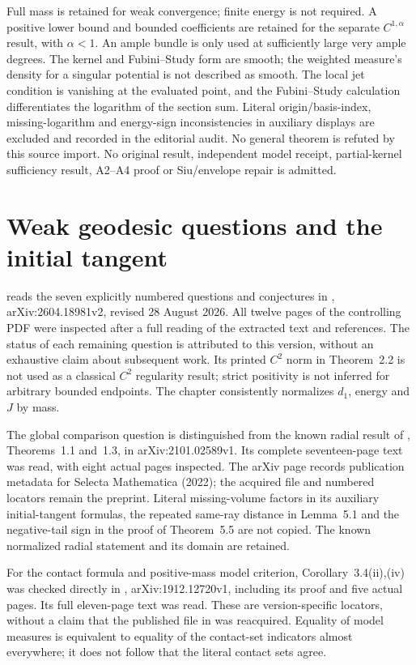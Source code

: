 Full mass is retained for weak convergence; finite energy is not
required. A positive lower bound and bounded coefficients are
retained for the separate $C^{1,\alpha}$ result, with $\alpha<1$.
An ample bundle is only used at sufficiently large very ample degrees.
The kernel and Fubini--Study form are smooth; the weighted measure's
density for a singular potential is not described as smooth.
The local jet condition is vanishing at the evaluated point, and
the Fubini--Study calculation differentiates the logarithm of the
section sum. Literal origin/basis-index, missing-logarithm and
energy-sign inconsistencies in auxiliary displays are excluded and
recorded in the editorial audit. No general theorem is refuted by
this source import. No original result, independent model receipt,
partial-kernel sufficiency result, A2--A4 proof or Siu/envelope repair
is admitted.

\section{Weak geodesic questions and the initial tangent}
\label{sec:provenance-survey-initial-data}

 reads the seven explicitly numbered
questions and conjectures in \cite{Darvas26MetricSurveyV2},
arXiv:2604.18981v2, revised 28 August 2026.
All twelve pages of the controlling PDF were inspected after a
full reading of the extracted text and references. The status of
each remaining question is attributed to this version, without an
exhaustive claim about subsequent work. Its printed $C^2$ norm
in Theorem~2.2 is not used as a classical $C^2$ regularity result;
strict positivity is not inferred for arbitrary bounded endpoints.
The chapter consistently normalizes $d_1$, energy and $J$ by mass.

The global comparison question is distinguished from the known
radial result of \cite{DarvasGeorgeSmith21JV1}, Theorems~1.1
and~1.3, in arXiv:2101.02589v1.
Its complete seventeen-page text was read, with eight actual
pages inspected. The arXiv page records publication metadata for
Selecta Mathematica (2022); the acquired file and numbered
locators remain the preprint. Literal missing-volume factors in
its auxiliary initial-tangent formulas, the repeated same-ray
distance in Lemma~5.1 and the negative-tail sign in the proof
of Theorem~5.5 are not copied. The known normalized radial
statement and its domain are retained.

For the contact formula and positive-mass model criterion,
Corollary~3.4(ii),(iv) was checked directly in
\cite{DNT19ContactV1}, arXiv:1912.12720v1, including its
proof and five actual pages. Its full eleven-page text was
read. These are version-specific locators, without a claim
that the published file in \cite{DNT21} was reacquired.
Equality of model measures is equivalent to equality of the
contact-set indicators almost everywhere; it does not follow
that the literal contact sets agree.

